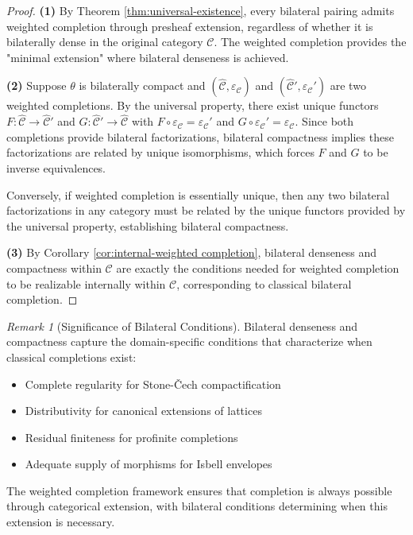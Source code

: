 \documentclass[11pt]{article}
\theoremstyle{plain}
\theoremstyle{definition}
\theoremstyle{remark}
\newtheorem{remark}[theorem]{Remark}
\newcommand{\C}{\mathcal{C}}
\newcommand{\wh}[1]{\widehat{#1}}
\begin{document}
\begin{proof}
\textbf{(1)} By Theorem \ref{thm:universal-existence}, every bilateral pairing admits weighted completion through presheaf extension, regardless of whether it is bilaterally dense in the original category $\C$. The weighted completion provides the "minimal extension" where bilateral denseness is achieved.

\textbf{(2)} Suppose $\theta$ is bilaterally compact and $(\wh{\C}, \varepsilon_\C)$ and $(\wh{\C}', \varepsilon_\C')$ are two weighted completions. By the universal property, there exist unique functors $F : \wh{\C} \to \wh{\C}'$ and $G : \wh{\C}' \to \wh{\C}$ with $F \circ \varepsilon_\C = \varepsilon_\C'$ and $G \circ \varepsilon_\C' = \varepsilon_\C$. Since both completions provide bilateral factorizations, bilateral compactness implies these factorizations are related by unique isomorphisms, which forces $F$ and $G$ to be inverse equivalences.

Conversely, if weighted completion is essentially unique, then any two bilateral factorizations in any category must be related by the unique functors provided by the universal property, establishing bilateral compactness.

\textbf{(3)} By Corollary \ref{cor:internal-weighted completion}, bilateral denseness and compactness within $\C$ are exactly the conditions needed for weighted completion to be realizable internally within $\C$, corresponding to classical bilateral completion.
\end{proof}

\begin{remark}[Significance of Bilateral Conditions]
Bilateral denseness and compactness capture the domain-specific conditions that characterize when classical completions exist:
\begin{itemize}
\item Complete regularity for Stone-\v{C}ech compactification
\item Distributivity for canonical extensions of lattices  
\item Residual finiteness for profinite completions
\item Adequate supply of morphisms for Isbell envelopes
\end{itemize}
The weighted completion framework ensures that completion is always possible through categorical extension, with bilateral conditions determining when this extension is necessary.
\end{remark}
\end{document}
